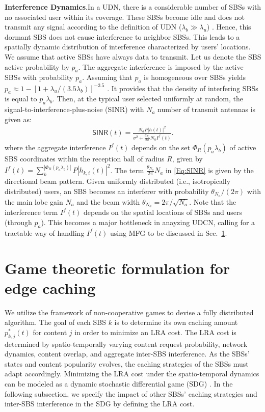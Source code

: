 \documentclass{book}
\begin{document}
    
    
    
    \textbf{Interference Dynamics}.\quad In a UDN, there is a considerable number of SBSs with no associated user within its coverage. These SBSs become idle and does not transmit any signal according to the definition of UDN ($\lambda_b\! \gg \!\lambda_u$) \cite{interf_udn}. Hence, this dormant SBS does not cause interference to neighbor SBSs. This leads to a spatially dynamic distribution of interference characterized by  users' locations. We assume that active SBSs have always data to transmit. Let us denote the SBS active probability by $p_a$. The aggregate interference is imposed by the active SBSs with probability $p_a$. Assuming that $p_a$ is homogeneous over SBSs yields $p_a \approx 1-[1+\lambda_u/(3.5\lambda_b)]^{-3.5}$ \cite{SMYu}. It provides that the density of interfering SBSs is equal to $p_a\lambda_b$. Then, at the typical user selected uniformly at random, the signal-to-interference-plus-noise (\textsf{SINR}) with $N_a$ number of transmit antennas is given as:
    \begin{align}
    \mathsf{SINR}(t) = \frac{N_a P |h(t)|^2}{{\sigma^2+\frac{\theta_{N_a}}{2\pi}N_aI^f(t)}}. \label{Eq:SINR}
    \end{align}
    where the aggregate interference $I^f(t)$ depends on the set $\Phi_R(p_a\lambda_b)$ of active SBS coordinates within the reception ball of radius $R$, given by $I^f(t)=\sum^{|\Phi_R(p_a\lambda_b)|}_k{ P|h_{k,i}(t)|^2}$. The term $\frac{\theta_{N_a}}{2\pi}N_a$ in \eqref{Eq:SINR} is given by the directional beam pattern. Given uniformly distributed (i.e., isotropically distributed) users, an SBS becomes an interferer with probability $\theta_{N_a}/(2\pi)$ with the main lobe gain $N_a$ and the beam width $\theta_{N_a} = 2\pi/\sqrt{N_a}$. Note that the interference term $I^f(t)$ depends on the spatial locations of SBSs and users (through $p_a$). This becomes a major bottleneck in anayzing UDCN, calling for a tractable way of handling $I^f(t)$ using MFG to be discussed in Sec.~\ref{C_formulation}.

    
    \section{Game theoretic formulation for edge caching}\label{C_formulation}

    We utilize the framework of non-cooperative games  to devise a fully distributed algorithm. The goal of each SBS $k$ is to determine its own caching amount ${p}_{k,j}^*(t)$ for content $j$ in order to minimize an LRA cost. 
    The LRA cost is determined by spatio-temporally varying content request probability,  network dynamics, content overlap, and aggregate inter-SBS interference. 
    As the SBSs' states and content popularity evolves, the caching strategies of the SBSs must adapt accordingly. {Minimizing the LRA cost under the spatio-temporal dynamics can be modeled as a dynamic stochastic differential game (SDG) \cite{MFG_application}.} 
    In the following subsection, we specify the impact of other SBSs' caching strategies and inter-SBS interference in the SDG by defining the LRA cost. 
    
\end{document}
